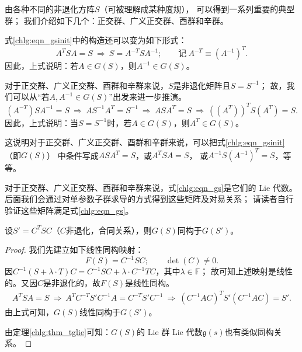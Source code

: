 由各种不同的非退化方阵$S$（可被理解成某种度规），
可以得到一系列重要的典型群；
我们介绍如下几个：正交群、广义正交群、酉群和辛群。

式\eqref{chlg:eqn_gsinit}中的构造还可以变为如下形式：
\begin{equation}\label{chlg:eqn_invaings}
    A^T S {A} =S \ \Rightarrow \ S = A^{-T} S {A^{-1}} ; \qquad
    \text{记}\  A^{-T}\equiv ({A^{-1}})^T .
\end{equation}
因此，上式说明：若$A\in G(S)$，则$A^{-1} \in G(S)$。


对于正交群、广义正交群、酉群和辛群来说，$S$是非退化矩阵且$S=S^{-1}$；
故，我们可以从“若$A, A^{-1}\in G(S)$”出发来进一步推演。
\begin{equation*} %
    (A^{-T}) S {A^{-1}} =S \ \Rightarrow \ 
    {A} S^{-1} A^T = S^{-1} \ \Rightarrow \ {A} S A^T = S
    \ \Rightarrow \  \left({({A}^T)}\right)^T S ({A}^T) = S .
\end{equation*}
因此，上式说明：当$S=S^{-1}$时，若$A\in G(S)$，则${A}^T \in G(S)$。

这说明对于正交群、广义正交群、酉群和辛群来说，可以把式\eqref{chlg:eqn_gsinit}（即$G(S)$）
中条件写成$ A S {A}^T =S$，或$ {A}^T S A =S$，
或$  A^{-1} S ({A^{-1}})^T =S$，等等。

对于正交群、广义正交群、酉群和辛群来说，式\eqref{chlg:eqn_gs}是它们的 Lie 代数。
后面我们会通过对单参数子群求导的方式得到这些矩阵及对易关系；
请读者自行验证这些矩阵满足式\eqref{chlg:eqn_gs}。



\begin{proposition}
    设$S'= C^T S C $（$C$非退化，合同关系），则$G(S)$同构于$G(S')$。
\end{proposition}
\begin{proof}
    我们先建立如下线性同构映射：
    \begin{equation}
        F(S)=C^{-1}SC;\qquad \det(C)\neq 0.
    \end{equation}    
    因$C^{-1}(S+\lambda \cdot T)C= C^{-1}SC +\lambda \cdot C^{-1}TC $，其中$\lambda\in \mathbb{F}$；
    故可知上述映射是线性的。又因$C$是非退化的，故$F(S)$是线性同构。    
    \begin{align*}
        A^T S A = S \ \Rightarrow\ A^T C^{-T}S' C^{-1} A = C^{-T}S' C^{-1}
        \ \Rightarrow\ (C^{-1} A C)^{T} S' (C^{-1} A C) = S'  .
    \end{align*}
    由上式可知，$G(S)$线性同构于$G(S')$。
    
    由定理\ref{chlg:thm_tglie}可知：$G(S)$的 Lie 群 Lie 代数$\mathfrak{g}(s)$也有类似同构关系。
\end{proof}


